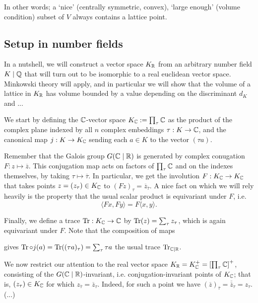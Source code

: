 In other words; a `nice' (centrally symmetric, convex), `large enough' (volume condition) subset of $V$ always contains a lattice point.


\subsection{Setup in number fields}

In a nutshell, we will construct a vector space $K_{\mathbb{R}}$ from an arbitrary number field $K\mid\mathbb{Q}$ that will turn out to be isomorphic to a real euclidean vector space. Minkowski theory will apply, and in particular we will show that the volume of a lattice in $K_{\mathbb{R}}$ has volume bounded by a value depending on the discriminant $d_K$ and ...

We start by defining the $\mathbb{C}$-vector space $K_{\mathbb{C}} := \prod_\tau \mathbb{C}$ as the product of the complex plane indexed by all $n$ complex embeddings $\tau:K\to\mathbb{C}$, and the canonical map $j:K\to K_{\mathbb{C}}$ sending each $a\in K$ to the vector $(\tau a)$.

Remember that the Galois group $G(\mathbb{C}\mid\mathbb{R})$ is generated by complex conugation $F:z\mapsto\overline{z}$. This conjugation map acts on factors of $\prod_\tau\mathbb{C}$ and on the indexes themselves, by taking $\tau\mapsto\overline{\tau}$. In particular, we get the involution $F:K_{\mathbb{C}}\to K_{\mathbb{C}}$ that takes points $z=(z_\tau)\in K_{\mathbb{C}}$ to $(Fz)_\tau = \overline{z}_{\overline{\tau}}$. A nice fact on which we will rely heavily is the property that the usual scalar product is equivariant under $F$, i.e.
\[
	\langle Fx,Fy \rangle = F\langle x,y \rangle.
\]

Finally, we define a trace $\operatorname{Tr}:K_{\mathbb{C}}\to\mathbb{C}$ by $\operatorname{Tr}(z) = \sum_\tau z_\tau$, which is again equivariant under $F$. Note that the composition of maps
\begin{center}
\end{center}

gives $\operatorname{Tr}\circ j(a) = \operatorname{Tr}((\tau a)_\tau) = \sum_\tau \tau a$ the usual trace $\operatorname{Tr}_{\mathbb{C}\mid\mathbb{R}}$.

We now restrict our attention to the real vector space $K_{\mathbb{R}} = K_{\mathbb{C}}^+ = \left[\prod_\tau\mathbb{C}\right]^+$, consisting of the $G(\mathbb{C}\mid\mathbb{R})$-invariant, i.e. conjugation-invariant points of $K_{\mathbb{C}}$; that is, $(z_\tau)\in K_{\mathbb{C}}$ for which $z_{\overline{\tau}}=\overline{z}_\tau$. Indeed, for such a point we have $(\overline{z})_{\overline{\tau}}= \overline{\overline{z}}_\tau = z_\tau$. (...)

